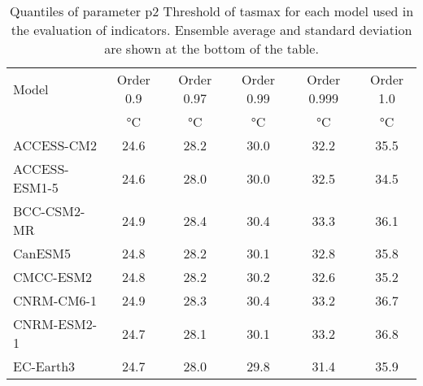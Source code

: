 \begin{table}
  \centering
  \caption{Quantiles of parameter $\mathrm{p2}$ {Threshold of \gls{tasmax}} for each model used in the evaluation of indicators. Ensemble average and standard deviation are shown at the bottom of the table.}
  \label{tab:parameters_heat_wave_max_length_thresh_tasmin}
  \begin{tabular}{lccccc}
    Model              & Order 0.9                    & Order 0.97                   & Order 0.99                   & Order 0.999                  & Order 1.0                    \\
                       & \unit{\degreeCelsius}        & \unit{\degreeCelsius}        & \unit{\degreeCelsius}        & \unit{\degreeCelsius}        & \unit{\degreeCelsius}        \\
    \hline
    ACCESS-CM2         & 24.6                         & 28.2                         & 30.0                         & 32.2                         & 35.5                         \\
    ACCESS-ESM1-5      & 24.6                         & 28.0                         & 30.0                         & 32.5                         & 34.5                         \\
    BCC-CSM2-MR        & 24.9                         & 28.4                         & 30.4                         & 33.3                         & 36.1                         \\
    CanESM5            & 24.8                         & 28.2                         & 30.1                         & 32.8                         & 35.8                         \\
    CMCC-ESM2          & 24.8                         & 28.2                         & 30.2                         & 32.6                         & 35.2                         \\
    CNRM-CM6-1         & 24.9                         & 28.3                         & 30.4                         & 33.2                         & 36.7                         \\
    CNRM-ESM2-1        & 24.7                         & 28.1                         & 30.1                         & 33.2                         & 36.8                         \\
    EC-Earth3          & 24.7                         & 28.0                         & 29.8                         & 31.4                         & 35.9                         \\

\end{tabular}
\end{table}

